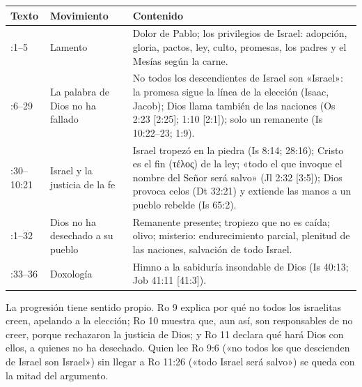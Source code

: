 \documentclass[11pt,letterpaper]{article}
\newcommand{\grc}[1]{\foreignlanguage{ancientgreek}{#1}}
\begin{document}
\begin{center}\small
\renewcommand{\arraystretch}{1.3}
\begin{tabular}{>{\RaggedRight\arraybackslash}p{2.0cm}>{\RaggedRight\arraybackslash}p{4.4cm}>{\RaggedRight\arraybackslash}p{7.6cm}}
\toprule
\textbf{Texto} & \textbf{Movimiento} & \textbf{Contenido}\\
\midrule
9:1--5 & Lamento & Dolor de Pablo; los privilegios de Israel: adopción, gloria, pactos, ley, culto, promesas, los padres y el Mesías según la carne.\\
9:6--29 & La palabra de Dios no ha fallado & No todos los descendientes de Israel son «Israel»: la promesa sigue la línea de la elección (Isaac, Jacob); Dios llama también de las naciones (Os 2:23 [2:25]; 1:10 [2:1]); solo un remanente (Is 10:22--23; 1:9).\\
9:30--10:21 & Israel y la justicia de la fe & Israel tropezó en la piedra (Is 8:14; 28:16); Cristo es el fin (\grc{τέλος}) de la ley; «todo el que invoque el nombre del Señor será salvo» (Jl 2:32 [3:5]); Dios provoca celos (Dt 32:21) y extiende las manos a un pueblo rebelde (Is 65:2).\\
11:1--32 & Dios no ha desechado a su pueblo & Remanente presente; tropiezo que no es caída; olivo; misterio: endurecimiento parcial, plenitud de las naciones, salvación de todo Israel.\\
11:33--36 & Doxología & Himno a la sabiduría insondable de Dios (Is 40:13; Job 41:11 [41:3]).\\
\bottomrule
\end{tabular}\end{center}

La progresión tiene sentido propio. Ro 9 explica por qué no todos los israelitas creen, apelando a la elección; Ro 10 muestra que, aun así, son responsables de no creer, porque rechazaron la justicia de Dios; y Ro 11 declara qué hará Dios con ellos, a quienes no ha desechado. Quien lee Ro 9:6 («no todos los que descienden de Israel son Israel») sin llegar a Ro 11:26 («todo Israel será salvo») se queda con la mitad del argumento.
\end{document}

